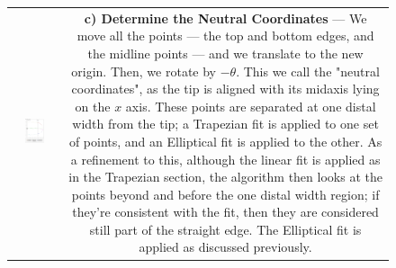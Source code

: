 \begin{figure}[p!]
\begin{tabular}{cc}
    \\ 
   \includegraphics[width=0.45\textwidth, height=0.5\textwidth]{Chapter4/Figs/Model_NeutralCoords_FSkin_Ring.jpg} &
    \parbox[b][0.5\textwidth][s]{0.55\textwidth}{
         \textbf{c) Determine the Neutral Coordinates} --- We move all the points --- the top and bottom edges, and the midline points --- and we translate to the new origin. Then, we rotate by $-\theta$. This we call the "neutral coordinates", as the tip is aligned with its midaxis lying on the $x$ axis. These points are separated at one distal width from the tip; a Trapezian fit is applied to one set of points, and an Elliptical fit is applied to the other. As a refinement to this, although the linear fit is applied as in the Trapezian section, the algorithm then looks at the points beyond and before the one distal width region; if they're consistent with the fit, then they are considered still part of the straight edge. The Elliptical fit is applied as discussed previously. \vfill
    }
    \end{tabular}\\
\end{figure}
\addtocounter{figure}{-1}

